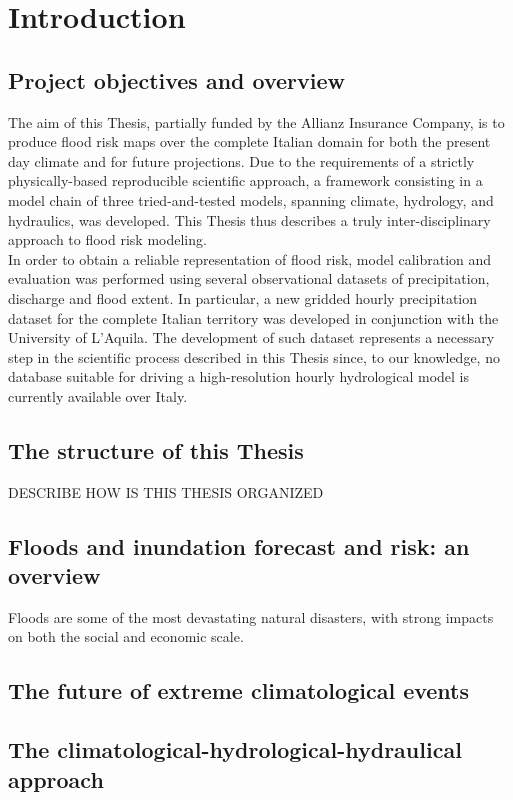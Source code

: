 \chapter{Introduction}

\section{Project objectives and overview}
The aim of this Thesis, partially funded by the Allianz Insurance Company, is to produce flood risk maps over the complete Italian domain for both the present day climate and for future projections. Due to the requirements of a strictly physically-based reproducible scientific approach, a framework consisting in a model chain of three tried-and-tested models, spanning climate, hydrology, and hydraulics, was developed. This Thesis thus describes a truly inter-disciplinary approach to flood risk modeling.\\
In order to obtain a reliable representation of flood risk, model calibration and evaluation was performed using several observational datasets of precipitation, discharge and flood extent. In particular, a new gridded hourly precipitation dataset for the complete Italian territory was developed in conjunction with the University of L'Aquila. The development of such dataset represents a necessary step in the scientific process described in this Thesis since, to our knowledge, no database suitable for driving a high-resolution hourly hydrological model is currently available over Italy.\\

\section{The structure of this Thesis}
DESCRIBE HOW IS THIS THESIS ORGANIZED

\section{Floods and inundation forecast and risk: an overview}
Floods are some of the most devastating natural disasters, with strong impacts on both the social and economic scale.

\section{The future of extreme climatological events}

\section{The climatological-hydrological-hydraulical approach}
